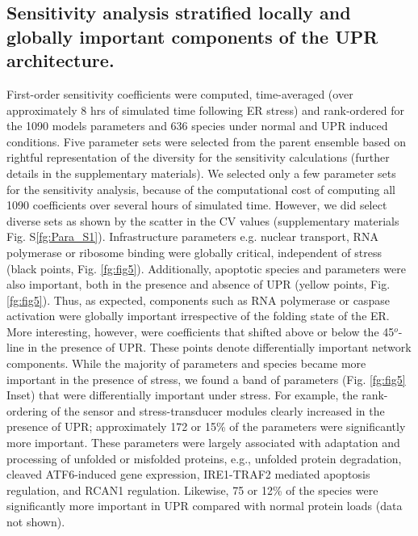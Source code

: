 \documentclass[fleqn,10pt]{wlscirep}
\begin{document}
\subsection*{Sensitivity analysis stratified locally and globally important components of the UPR architecture.} 
First-order sensitivity coefficients were computed, time-averaged (over approximately 8 hrs of simulated time following ER stress) and rank-ordered for the 1090 models parameters and 636 species under normal and UPR induced conditions. Five parameter sets were selected from the parent ensemble based on rightful representation of the diversity for the sensitivity calculations (further details in the supplementary materials). We selected only a few parameter sets for the sensitivity analysis, because of the computational cost of computing all 1090 coefficients over several hours of simulated time. However, we did select diverse sets as shown by the scatter in the CV values (supplementary materials Fig. S\ref{fg:Para_S1}). Infrastructure parameters e.g. nuclear transport, RNA polymerase or ribosome binding were globally critical, independent of stress (black points, Fig. \ref{fg:fig5}). Additionally, apoptotic species and parameters were also important, both in the presence and absence of UPR (yellow points, Fig. \ref{fg:fig5}). Thus, as expected, components such as RNA polymerase or caspase activation were globally important irrespective of the folding state of the ER. More interesting, however, were coefficients that shifted above or below the 45$^{o}$-line in the presence of UPR. These points denote differentially important network components. While the majority of parameters and species became more important in the presence of stress, we found a band of parameters (Fig. \ref{fg:fig5} Inset) that were differentially important under stress. For example, the rank-ordering of the sensor and stress-transducer modules clearly increased in the presence of UPR; approximately 172 or 15\% of the parameters were significantly more important. These parameters were largely associated with adaptation and processing of unfolded or misfolded proteins, e.g., unfolded protein degradation, cleaved ATF6-induced gene expression, IRE1-TRAF2 mediated apoptosis regulation, and RCAN1 regulation. Likewise, 75 or 12\% of the species were significantly more important in UPR compared with normal protein loads (data not shown).
\end{document}

